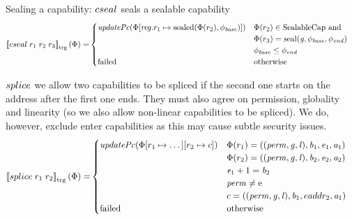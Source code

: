 \documentclass[a4paper]{article}
\newcommand{\sem}[1]{\left\llbracket #1 \right\rrbracket}
\newcommand{\tsem}[2][\Phi]{\sem{#2}_{\mathrm{trg}}(#1)}
\newcommand{\totherwise}{\text{otherwise }}
\newcommand{\targetcolor}[1]{\color{black}}
\newcommand{\trg}[1]{{\targetcolor{} #1}}
\newcommand{\zinstr}[1]{#1}
\newcommand{\twoinstr}[3]{
  \ifthenelse{\equal{#2#3}{}}
  {\zinstr{#1}}
  {\zinstr{#1} \; #2 \; #3}
}
\newcommand{\threeinstr}[4]{
  \ifthenelse{\equal{#2#3#4}{}}
  {\zinstr{#1}}
  {\zinstr{#1} \; #2 \; #3 \; #4}
}
\newcommand{\tsplice}[2]{\twoinstr{\trg{splice}}{#1}{#2}}
\newcommand{\tcseal}[3]{\threeinstr{\trg{cseal}}{#1}{#2}{#3}}
\newcommand{\update}[2]{[#1 \mapsto #2]}
\newcommand{\shareddom}[1]{\mathrm{#1}}
\newcommand{\SealableCaps}{\shareddom{SealableCap}}
\newcommand{\perm}{\var{perm}}
\newcommand{\gl}{\var{g}}
\newcommand{\lin}{\var{l}}
\newcommand{\seal}[1]{\shareddom{seal}(#1)}
\newcommand{\sealed}[1]{\shareddom{sealed}(#1)}
\newcommand{\failed}{\mathrm{failed}}
\newcommand{\var}[1]{\mathit{#1}}
\newcommand{\reg}{\var{reg}}
\newcommand{\baddr}{\var{b}}
\newcommand{\eaddr}{\var{e}}
\newcommand{\aaddr}{\var{a}}
\newcommand{\plainperm}[1]{\mathrm{#1}}
\newcommand{\enter}{\plainperm{e}}
\newcommand{\plainfun}[2]{
  \ifthenelse{\equal{#2}{}}
  {\mathit{#1}}
  {\mathit{#1}(#2)}
}
\newcommand{\updPcAddr}[1]{\plainfun{updatePc}{#1}}
\begin{document}
Sealing a capability: $\tcseal{}{}{}$ seals a sealable capability
\begin{align*}
  \tsem{\tcseal{r_1}{r_2}{r_3}} = & 
                                    \begin{cases}
                                      \updPcAddr{\Phi\update{\reg.r_1}{\sealed{\Phi(r_2),\phi_{\var{base}}}}} &
                                      \arraycolsep=0pt
                                      \begin{array}[t]{l}
                                        \Phi(r_2) \in \SealableCaps \text{ and } \\
                                        \Phi(r_3) = \seal{\gl,\phi_{\var{base}},\phi_{\var{end}}} \\
                                        \phi_{\var{base}} \leq \phi_{\var{end}} %
                                      \end{array} \\
                                      \failed & \text{otherwise}
                                    \end{cases}
\end{align*}

$\tsplice{}{}$ we allow two capabilities to be spliced if the second one starts on the address after the first one ends. They must also agree on permission, globality and linearity (so we also allow non-linear capabilities to be spliced). We do, however, exclude enter capabilities as this may cause subtle security issues.
\begin{align*}
  \tsem{\tsplice{r_1}{r_2}} = &
                                \begin{cases}
                                  \updPcAddr{\Phi\update{r_1}{\dots}\update{r_2}{c}} &
                                  \arraycolsep=0pt
                                  \begin{array}[t]{l}
                                    \Phi(r_1) = ((\perm, \gl, \lin), \baddr_1, \eaddr_1, \aaddr_1) \\
                                    \Phi(r_2) = ((\perm, \gl, \lin), \baddr_2, \eaddr_2, \aaddr_2) \\
                                    \eaddr_1 + 1 = \baddr_2 \\
                                    \perm \neq \enter \\
                                    c = ((\perm, \gl, \lin), \baddr_1, eaddr_2, \aaddr_1)
                                  \end{array}
                                  \\
                                  \failed & \totherwise
                                \end{cases}
\end{align*}
\end{document}
